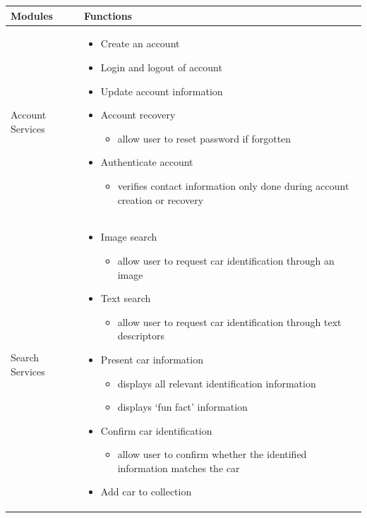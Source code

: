 \documentclass[]{article}
\begin{document}
\begin{tabular}{|p{3cm}|p{13cm}|}
	\hline
	Modules & Functions \\
	\hline
	Account Services &
	\begin{itemize} [left=2pt]
		\item Create an account
		\item Login and logout of account
		\item Update account information
		\item Account recovery
		\begin{itemize}
			\item allow user to reset password if forgotten
		\end{itemize}
		\item Authenticate account
		\begin{itemize}
			\item verifies contact information only done during account creation or recovery
		\end{itemize}
	\end{itemize} \\
	\hline
	Search Services &
	\begin{itemize} [left=2pt]
		\item Image search
		\begin{itemize}
			\item allow user to request car identification through an image
		\end{itemize}
		\item Text search
		\begin{itemize}
			\item allow user to request car identification through  text descriptors
		\end{itemize}
		\item Present car information
		\begin{itemize}
			\item displays all relevant identification information
			\item displays ‘fun fact’ information
		\end{itemize}
		\item Confirm car identification
		\begin{itemize}
			\item allow user to confirm whether the identified information matches the car
		\end{itemize}
		\item Add car to collection
		\begin{itemize}

\end{itemize}
\end{itemize}
\end{tabular}
\end{document}
